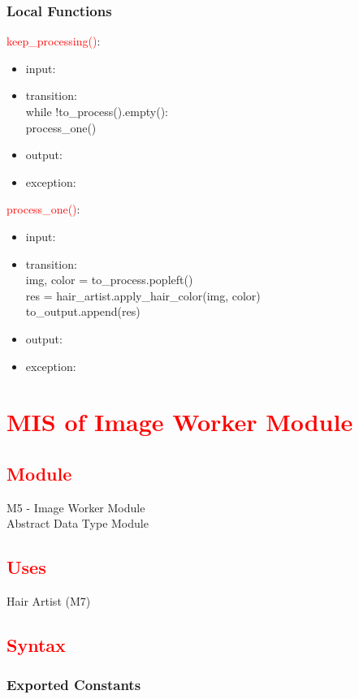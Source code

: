 \documentclass[12pt, titlepage]{article}
\begin{document}
\subsubsection{Local Functions}
\textcolor{red}{keep\_processing()}:  
\begin{itemize}
\item input:
\item transition: \\
while !to\_process().empty():\\
process\_one()
\item output:
\item exception:
\end{itemize}

\noindent
\textcolor{red}{process\_one()}: 
\begin{itemize}
\item input:
\item transition: \\
img, color = to\_process.popleft() \\
res = hair\_artist.apply\_hair\_color(img, color) \\
to\_output.append(res)
\item output:
\item exception:
\end{itemize}

\newpage
\section{\textcolor{red}{MIS of Image Worker Module}}
\subsection{\textcolor{red}{Module}}
M5 - Image Worker Module\\
Abstract Data Type Module

\subsection{\textcolor{red}{Uses}}
Hair Artist (M7)

\subsection{\textcolor{red}{Syntax}}

\subsubsection{Exported Constants}
\end{document}
